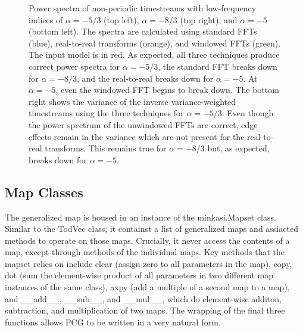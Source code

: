 \documentclass[12]{article}
\begin{document}
\begin{figure}
\begin{subfigure}[t]{0.45\textwidth}
    \end{subfigure}
    \caption{Power spectra of non-periodic timestreams with
      low-frequency indices of $\alpha=-5/3$ (top left), $\alpha=-8/3$
      (top right), and $\alpha=-5$ (bottom left).  The spectra are
      calculated using standard FFTs (blue), real-to-real transforms
      (orange), and windowed FFTs (green).  The input model is in
      red.  As expected, all three techniques produce correct power
      spectra for $\alpha=-5/3$, the standard FFT breaks down for
      $\alpha=-8/3$, and the real-to-real breaks down for
      $\alpha=-5$.  At $\alpha=-5$, even the windowed FFT begins to
      break down.  The bottom right shows the variance of the
      inverse variance-weighted timestreams using the three techniques
      for $\alpha=-5/3$.  Even though the power spectrum of the
      unwindowed FFTs are correct, edge effects remain in the variance
      which are not present for the real-to-real transforms.  This
      remains true for $\alpha=-8/3$ but, as expected, breaks down for
      $\alpha=-5$.}
    \label{fig:noise_sims}
\end{figure}













\subsection {Map Classes}

The generalized map is housed in an instance of the minkasi.Mapset
class.  Similar to the TodVec class, it containst a list of
generalized maps and assiacted methods to operate on those maps.
Crucially, it never access the contents of a map, except through
methods of the individual maps.  Key methods that the mapset relies on
include clear (assign zero to all parameters in the map), copy, dot
(sum the element-wise product of all parameters in two different map
instances of the same class), axpy (add a multiple of a second map to
a map), and \_\_add\_\_, \_\_sub\_\_, and \_\_mul\_\_, which do element-wise
additon, subtraction, and multiplication of two maps.  The wrapping of
the final three functions allows PCG to be written in a very natural
form.
\end{document}
